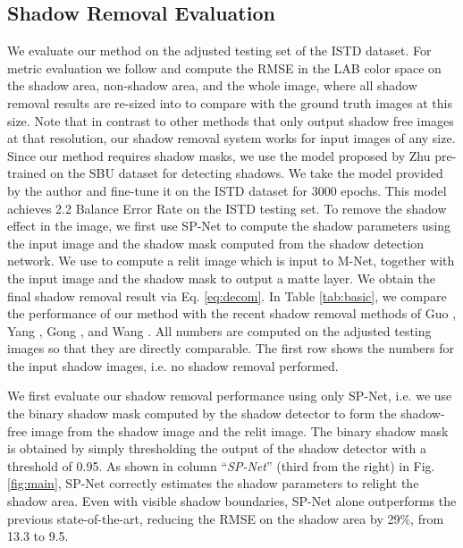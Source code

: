 \subsection{Shadow Removal Evaluation}
 
We evaluate our method on the adjusted testing set of the ISTD dataset. For metric evaluation we follow \cite{Wang_2018_CVPR} and compute the RMSE in the LAB color space on the shadow area, non-shadow area, and the whole image, where all shadow removal results are re-sized into  to compare with the ground truth images at this size.  Note that in contrast to other methods that only output shadow free images at that resolution, our shadow removal system works for input images of any size. Since our method requires shadow masks, we use the model proposed by Zhu \etal \cite{zhu18b} pre-trained on the SBU dataset \cite{Vicente-etal-ECCV16} for detecting shadows. We take the model provided by the author and fine-tune it on the ISTD dataset for 3000 epochs. This model achieves 2.2 Balance Error Rate on the ISTD testing set. To remove the shadow effect in the image, we first use SP-Net to compute the shadow parameters  using the input image and the shadow mask computed from the shadow detection network. We use  to compute a relit image which is input to M-Net, together with the input image and the shadow mask to output a matte layer. We obtain the final shadow removal result via Eq. \ref{eq:decom}. In Table \ref{tab:basic}, we compare the performance of our method with the recent shadow removal methods of Guo \etal \cite{guoPami}, Yang \etal \cite{Yang12}, Gong \etal \cite{Gong16}, and Wang \etal \cite{Wang_2018_CVPR}. All numbers are computed on the adjusted testing images so that they are directly comparable. The first row shows the numbers for the input shadow images, i.e. no shadow removal performed.



We first evaluate our shadow removal performance using only SP-Net, i.e.  we use the binary shadow mask computed by the shadow detector to form the shadow-free image from the shadow image and the relit image. 
The binary shadow mask is obtained by simply thresholding the output of the shadow detector with a threshold of 0.95. As shown in  column ``\textit{SP-Net}'' (third from the right) in Fig. \ref{fig:main}, SP-Net correctly estimates the shadow parameters to relight the shadow area. Even with visible shadow boundaries, SP-Net alone outperforms the previous state-of-the-art, reducing the RMSE on the shadow area by 29\%, from 13.3 to 9.5. 


